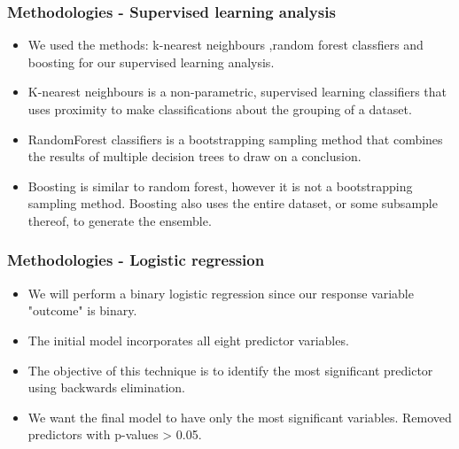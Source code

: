 \documentclass{beamer}
\begin{document}
\begin{frame}
\end{frame}

\begin{frame}
    \frametitle{Methodologies - Supervised learning analysis}
        \begin{itemize}
            \setlength\itemsep{1em}
            \item We used the methods: k-nearest neighbours ,random forest classfiers and boosting for our supervised learning analysis.
            \item K-nearest neighbours is a non-parametric, supervised learning classifiers that uses proximity to make classifications about the grouping of a dataset.
            \item RandomForest classifiers is a bootstrapping sampling method that combines the results of multiple decision trees to draw on a conclusion.
            \item Boosting is similar to random forest, however it is not a bootstrapping sampling method. Boosting also uses the entire dataset, or some subsample thereof, to generate the ensemble.
        \end{itemize}
\end{frame}

\begin{frame}
    \frametitle{Methodologies - Logistic regression}
        \begin{itemize}
            \setlength\itemsep{1em}
            \item We will perform a binary logistic regression since our response variable "outcome" is binary.
            \item The initial model incorporates all eight predictor variables.
            \item The objective of this technique is to identify the most significant predictor using backwards elimination.
            \item We want the final model to have only the most significant variables. Removed predictors with p-values > 0.05.
        \end{itemize}
\end{frame}

\end{document}
